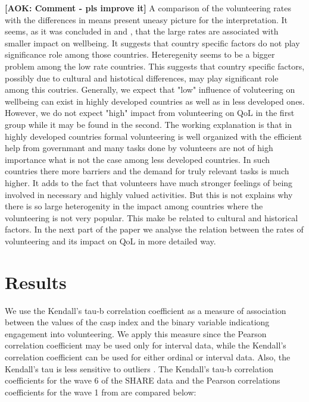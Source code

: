 \documentclass[10pt, letterpaper]{article}
\begin{document}
\begin{spacing}{1.4}
\textbf{[AOK: Comment - pls improve it]} A comparison of the volunteering rates with the differences in means present uneasy picture for the interpretation. It seems, as it was concluded in \citet{haski09} and \citet{pagnol10}, that the large rates are associated with smaller impact on wellbeing. It suggests that country specific factors do not play significance role among those countries. Heteregenity seems to be a bigger problem among the low rate countries. This suggests that country specific factors, possibly due to cultural and histotical differences, may play significant role among this coutries. Generally, we expect that "low" influence of voluteering on wellbeing can exist in highly developed countries as well as in less developed ones. However, we do not expect "high" impact from volunteering on QoL in the first group while it may be found in the second. The working explanation is that in highly developed countries formal volunteering is well organized with the efficient help from governmant and many tasks done by volunteers are not of high importance what is not the case among less developed countries. In such countries there more barriers and the demand for truly relevant tasks is much higher. It adds to the fact that volunteers have much stronger feelings of being involved in necessary and highly valued activities. But this is not explains why there is so large heterogenity in the impact among countries where the volunteering is not very popular. This make be related to cultural and historical factors. In the next part of the paper we analyse the relation between the rates of volunteering and its impact on QoL in more detailed way.   



\section{Results}

We use the Kendall's tau-b correlation coefficient as a measure of association between the values of the casp index and the binary variable indicationg engagement into volunteering. We apply this measure since the Pearson correlation coefficient may be used only for interval data, while the Kendall's correlation coefficient can be used for either ordinal or interval data. Also, the Kendall's tau is less sensitive to outliers  \citet{khamis08}. The Kendall's tau-b correlation coefficients for the wave 6 of the SHARE data and the Pearson correlations coefficients for the wave 1 from \citet{haski09} are compared below: 



\end{spacing}
\end{document}
